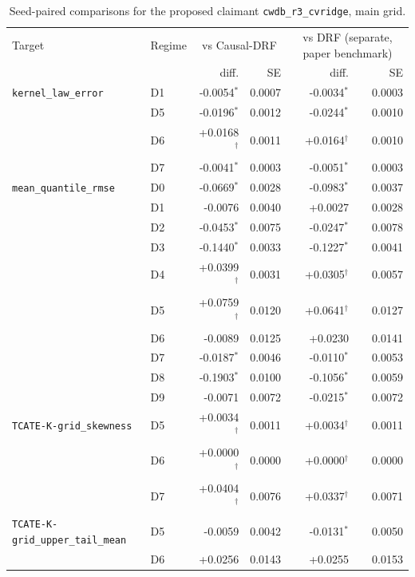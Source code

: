 \begin{table}[htbp]
\centering
\caption{Seed-paired comparisons for the proposed claimant \texttt{cwdb\_r3\_cvridge}, main grid.}
\label{tab:paired-r3}
\scriptsize
\setlength{\tabcolsep}{4pt}
\begin{tabular}{@{}llrrrr@{}}
\toprule
Target & Regime & \multicolumn{2}{c}{vs Causal-DRF} & \multicolumn{2}{c}{vs DRF (separate, paper benchmark)} \\
  &   & diff. & SE & diff. & SE \\
\midrule
\texttt{kernel\_law\_error} & D1 & -0.0054$^{\ast}$ & 0.0007 & -0.0034$^{\ast}$ & 0.0003 \\
 & D5 & -0.0196$^{\ast}$ & 0.0012 & -0.0244$^{\ast}$ & 0.0010 \\
 & D6 & +0.0168$^{\dagger}$ & 0.0011 & +0.0164$^{\dagger}$ & 0.0010 \\
 & D7 & -0.0041$^{\ast}$ & 0.0003 & -0.0051$^{\ast}$ & 0.0003 \\
\texttt{mean\_quantile\_rmse} & D0 & -0.0669$^{\ast}$ & 0.0028 & -0.0983$^{\ast}$ & 0.0037 \\
 & D1 & -0.0076 & 0.0040 & +0.0027 & 0.0028 \\
 & D2 & -0.0453$^{\ast}$ & 0.0075 & -0.0247$^{\ast}$ & 0.0078 \\
 & D3 & -0.1440$^{\ast}$ & 0.0033 & -0.1227$^{\ast}$ & 0.0041 \\
 & D4 & +0.0399$^{\dagger}$ & 0.0031 & +0.0305$^{\dagger}$ & 0.0057 \\
 & D5 & +0.0759$^{\dagger}$ & 0.0120 & +0.0641$^{\dagger}$ & 0.0127 \\
 & D6 & -0.0089 & 0.0125 & +0.0230 & 0.0141 \\
 & D7 & -0.0187$^{\ast}$ & 0.0046 & -0.0110$^{\ast}$ & 0.0053 \\
 & D8 & -0.1903$^{\ast}$ & 0.0100 & -0.1056$^{\ast}$ & 0.0059 \\
 & D9 & -0.0071 & 0.0072 & -0.0215$^{\ast}$ & 0.0072 \\
\texttt{TCATE-K-grid\_skewness} & D5 & +0.0034$^{\dagger}$ & 0.0011 & +0.0034$^{\dagger}$ & 0.0011 \\
 & D6 & +0.0000$^{\dagger}$ & 0.0000 & +0.0000$^{\dagger}$ & 0.0000 \\
 & D7 & +0.0404$^{\dagger}$ & 0.0076 & +0.0337$^{\dagger}$ & 0.0071 \\
\texttt{TCATE-K-grid\_upper\_tail\_mean} & D5 & -0.0059 & 0.0042 & -0.0131$^{\ast}$ & 0.0050 \\
 & D6 & +0.0256 & 0.0143 & +0.0255 & 0.0153 \\

\end{tabular}
\end{table}
